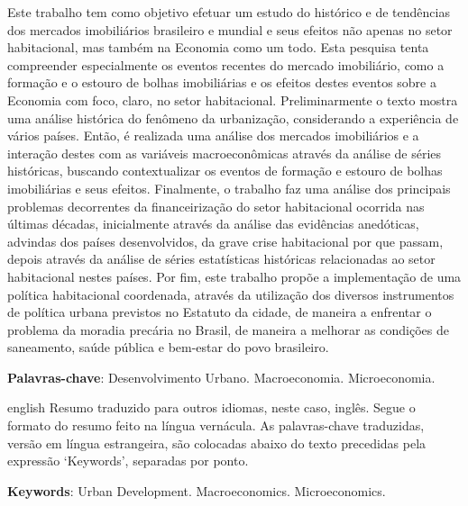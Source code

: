 \documentclass[
	12pt,				%
	oneside,			%
	a4paper,			%
	chapter=TITLE,		%
	section=TITLE,		%
	english,			%
	brazil				%
	]{abntex2}
\begin{document}
\setlength{\absparsep}{18pt} %
\begin{resumo}
	\SingleSpacing
  Este trabalho tem como objetivo efetuar um estudo do histórico e de tendências
  dos mercados imobiliários brasileiro e mundial e seus efeitos não apenas no
  setor habitacional, mas também na Economia como um todo. Esta pesquisa tenta
  compreender especialmente os eventos recentes do mercado imobiliário, como a
  formação e o estouro de bolhas imobiliárias e os efeitos destes eventos sobre a
  Economia com foco, claro, no setor habitacional. Preliminarmente o texto mostra
  uma análise histórica do fenômeno da urbanização, considerando a experiência de
  vários países. Então, é realizada uma análise dos mercados imobiliários e a
  interação destes com as variáveis macroeconômicas através da análise de séries
  históricas, buscando contextualizar os eventos de formação e estouro de bolhas
  imobiliárias e seus efeitos. Finalmente, o trabalho faz uma análise dos
  principais problemas decorrentes da financeirização do setor habitacional
  ocorrida nas últimas décadas, inicialmente através da análise das evidências
  anedóticas, advindas dos países desenvolvidos, da grave crise habitacional por
  que passam, depois através da análise de séries estatísticas históricas
  relacionadas ao setor habitacional nestes países. Por fim, este trabalho propõe
  a implementação de uma política habitacional coordenada, através da utilização
  dos diversos instrumentos de política urbana previstos no Estatuto da cidade, de
  maneira a enfrentar o problema da moradia precária no Brasil, de maneira a
  melhorar as condições de saneamento, saúde pública e bem-estar do povo
  brasileiro. 
  
  \textbf{Palavras-chave}: 
    Desenvolvimento Urbano.
    Macroeconomia.
    Microeconomia.
  \end{resumo}
\begin{resumo}[Abstract]
	\SingleSpacing
	\begin{otherlanguage*}{english}
		Resumo traduzido para outros idiomas, neste caso, inglês. Segue o formato do resumo feito na língua vernácula. As palavras-chave traduzidas, versão em língua estrangeira, são colocadas abaixo do texto precedidas pela expressão `Keywords', separadas por ponto.
		
		\textbf{Keywords}:
	      Urban Development.
        Macroeconomics.
        Microeconomics.
    	\end{otherlanguage*}
\end{resumo}
\end{document}
